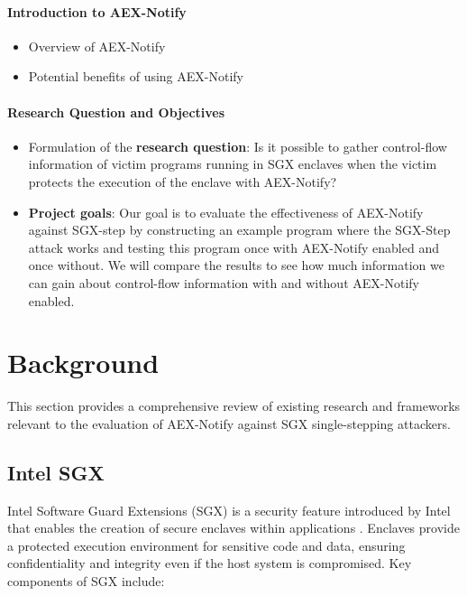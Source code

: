 \documentclass{llncs}
\begin{document}
\paragraph{Introduction to AEX-Notify}
\begin{itemize}
  \item Overview of AEX-Notify
  \item Potential benefits of using AEX-Notify
\end{itemize}

\paragraph{Research Question and Objectives}
\begin{itemize}
  \item Formulation of the \textbf{research question}:
    Is it possible to gather control-flow information of victim programs running
    in SGX enclaves when the victim protects the execution of the enclave with
    AEX-Notify?
  \item \textbf{Project goals}:
    Our goal is to evaluate the effectiveness of AEX-Notify against SGX-step by
    constructing an example program where the SGX-Step attack works and testing
    this program once with AEX-Notify enabled and once without. We will compare
    the results to see how much information we can gain about control-flow
    information with and without AEX-Notify enabled.
\end{itemize}

\section{Background}

This section provides a comprehensive review of existing research and frameworks
relevant to the evaluation of AEX-Notify against SGX single-stepping attackers.

\subsection{Intel SGX}

Intel Software Guard Extensions (SGX) is a security feature introduced by Intel
that enables the creation of secure enclaves within applications \cite{CostanD16}.
Enclaves provide a protected execution environment for sensitive code and data,
ensuring confidentiality and integrity even if the host system is compromised.
Key components of SGX include:
\end{document}
